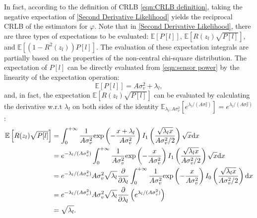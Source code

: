\documentclass[12pt,draftclsnofoot,journal,onecolumn]{IEEEtran}
\theoremstyle{nonumberplain}
\def \exp {\text{exp}}
\begin{document}
\begin{IEEEproof}
    In fact, according to the definition of CRLB \eqref{eqn:CRLB definition}, taking the negative expectation of \eqref{Second Derivative Likelihood} yields the reciprocal CRLB of the estimators for $\varphi$. Note that in \eqref{Second Derivative Likelihood}, there are three types of expectations to be evaluated: $\mathbb{E}\left[P[l]\right]$, $\mathbb{E}\left[R(z_l)\sqrt{P[l]}\right]$, and $\mathbb{E}\left[(1-R^2(z_l))P[l]\right]$. The evaluation of these expectation integrals are partially based on the properties of the non-central chi-square distribution. The expectation of $P[l]$ can be directly evaluated from \eqref{eqn:sensor power} by the linearity of the expectation operation:
    \begin{equation}
        \mathbb{E}\left[P[l]\right] = A\sigma_v^2 + \lambda_l,
        \label{eqn:expectation of P_l}
    \end{equation}
    and, in fact, the expectation $\mathbb{E}\left[R(z_l) \sqrt{P[l]}\right]$ can be evaluated by calculating the derivative w.r.t $\lambda_l$ on both sides of the identity $\mathbb{E}_{\lambda_l, A\sigma_v^2}[e^{\lambda_l/(A\sigma_v^2)}]=e^{\lambda_l/(A\sigma_v^2)}$:
    \begin{equation}
        \begin{aligned}
            \mathbb{E}\left[R(z_l) \sqrt{P[l]}\right] & = \int_{0}^{+\infty}{\frac{1}{A\sigma_v^2}\exp\left(-\frac{x+\lambda_l}{A\sigma_v^2}\right)I_1\left(\frac{\sqrt{\lambda_l x}}{A\sigma_v^2/2}\right)\sqrt{x}{\rm d}x}\\
            & = e^{-\lambda_l/(A\sigma_v^2)}\int_{0}^{+\infty}{\frac{1}{A\sigma_v^2}\exp\left(-\frac{x}{A\sigma_v^2}\right)I_1\left(\frac{\sqrt{\lambda_l x}}{A\sigma_v^2/2}\right)\sqrt{x}{\rm d}x} \\
            & = e^{-\lambda_l/(A\sigma_v^2)} A\sigma_v^2 \sqrt{\lambda_l} \frac{\partial}{\partial\lambda_l} \int_{0}^{+\infty}{\frac{1}{A\sigma_v^2}\exp\left(-\frac{x}{A\sigma_v^2}\right)I_0\left(\frac{\sqrt{\lambda_l x}}{A\sigma_v^2/2}\right) {\rm d}x}\\
            & = e^{-\lambda_l/(A\sigma_v^2)} A\sigma_v^2 \sqrt{\lambda_l} \frac{\partial}{\partial\lambda_l} \left(e^{\lambda_l/(A\sigma_v^2)}\right)\\
            & = \sqrt{\lambda_l}.\\
        \end{aligned}
        \label{eqn:expectation_second_kind_1}
    \end{equation}

\end{IEEEproof}
\end{document}
